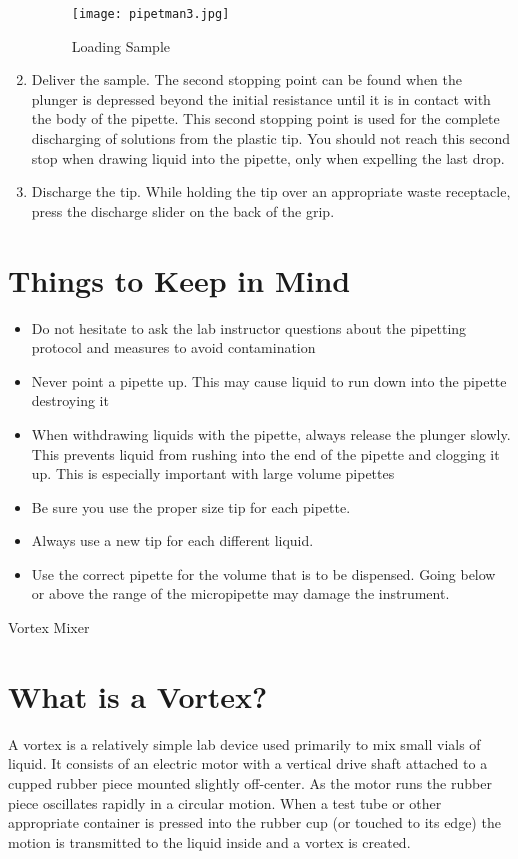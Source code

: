 \documentclass[12pt]{../SOP3_beta}\usepackage[]{graphicx}\usepackage[]{color}
\begin{document}
\begin{enumerate}
\begin{figure} [H!]
\caption{Loading Sample}
\texttt{[image: pipetman3.jpg]}
\end{figure}

\item Deliver the sample. The second stopping point can be found when the plunger is depressed beyond the initial resistance until it is in contact with the body of the pipette. This second stopping point is used for the complete discharging of solutions from the plastic tip. You should not reach this second stop when drawing liquid into the pipette, only when expelling the last drop.   
\item Discharge the tip. While holding the tip over an appropriate waste receptacle, press the discharge slider on the back of the grip.     

\end{enumerate}
\section{Things to Keep in Mind}
\begin{itemize}
  \item Do not hesitate to ask the lab instructor questions about the pipetting protocol and measures to avoid contamination 
\item Never point a pipette up. This may cause liquid to run down into the pipette destroying it
\item When withdrawing liquids with the pipette, always release the plunger slowly. This prevents liquid from rushing into the end of the pipette and clogging it up.  This is especially important with large volume pipettes 
\item Be sure you use the proper size tip for each pipette. 
\item Always use a new tip for each different liquid.
\item Use the correct pipette for the volume that is to be dispensed. Going below or above the range of the micropipette may damage the instrument.      

\end{itemize}


\NP Vortex Mixer
\section{What is a Vortex?}
A vortex is a relatively simple lab device used primarily to mix small vials of liquid. It consists of an electric motor with a vertical drive shaft attached to a cupped rubber piece mounted slightly off-center. As the motor runs the rubber piece oscillates rapidly in a circular motion. When a test tube or other appropriate container is pressed into the rubber cup (or touched to its edge) the motion is transmitted to the liquid inside and a vortex is created.
\end{document}
